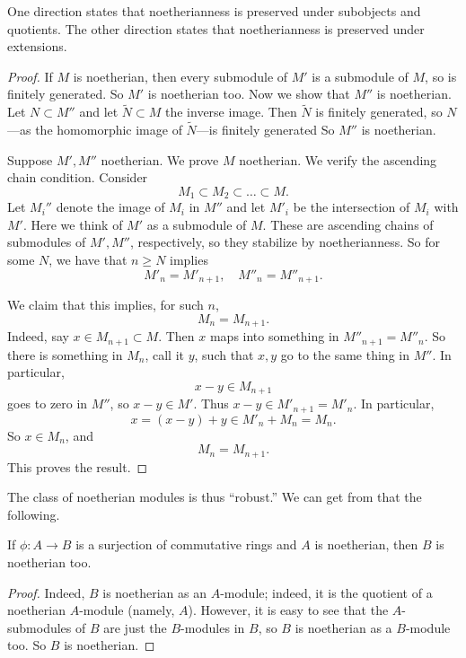One direction states that noetherianness is preserved under subobjects and
quotients. The other direction states that noetherianness is preserved under
extensions. 
\begin{proof} 
If $M$ is noetherian, then every submodule of $M'$ is a submodule of $M$, so is
finitely generated. So $M'$ is noetherian too. Now we show that $M''$ is
noetherian. Let $N \subset M''$ and let
$\widetilde{N} \subset M$ the inverse image. Then $\widetilde{N}$ is finitely generated, so
$N$---as the homomorphic image of $\widetilde{N}$---is finitely generated 
So $M''$ is noetherian.

Suppose $M', M''$ noetherian. We prove $M$ noetherian.
We verify the ascending chain condition. Consider
\[ M_1 \subset M_2 \subset \dots \subset M.  \]
Let $M_i''$ denote the image of $M_i$ in $M''$ and let $M'_i$ be the
intersection of $M_i$ with $M'$. Here we think of $M'$ as a submodule of $M$.
These are ascending chains of submodules of $M', M''$, respectively, so they
stabilize by noetherianness.
So for some $N$, we have
that $n \geq N$ implies 
\[ M'_n = M'_{n+1}, \quad M''_n = M''_{n+1}.  \]

We claim that this implies, for such $n$, 
\[ M_n = M_{n+1}.  \]
Indeed, say $x \in M_{n+1} \subset M$. Then $x$ maps into something in $M''_{n+1} = M''_n$.  
So there is something in $M_n$, call it $y$, such that $x,y$ go to the same
thing in $M''$. In particular, 
\[ x - y \in M_{n+1} \]
goes to zero in $M''$, so $x-y \in M'$. Thus $x-y \in M'_{n+1} = M'_n$. In
particular, 
\[ x = (x-y) + y \in M'_n + M_n = M_n.  \]
So $x \in M_n$, and 
\[ M_n = M_{n+1} . \]
This proves the result.
\end{proof} 

The class of noetherian modules is thus ``robust.'' We can get from that the
following.

\begin{proposition} 
If $\phi: A \to B$ is a surjection of commutative rings and $A$ is noetherian, then $B$ is
noetherian too.
\end{proposition} 
\begin{proof} 
Indeed, $B$ is noetherian as an $A$-module; indeed, it is the quotient of a
noetherian $A$-module (namely, $A$). However, it is easy to see that the
$A$-submodules of $B$ are just the $B$-modules in $B$, so $B$ is noetherian as a
$B$-module too. So $B$ is noetherian.  
\end{proof} 

